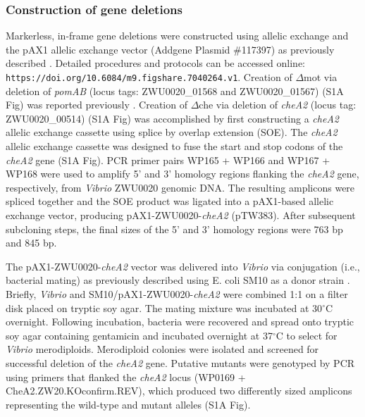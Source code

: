 {{{{{{{\subsubsection{Construction of gene deletions}
Markerless, in-frame gene deletions were constructed using allelic exchange and the pAX1 allelic exchange vector (Addgene Plasmid \#117397) as previously described \cite{wiles_modernized_2018}. Detailed procedures and protocols can be accessed online: \texttt{https://doi.org/10.6084/m9.figshare.7040264.v1}. Creation of $\Delta$mot via deletion of \textit{\textit{pomAB}} (locus tags: ZWU0020\_01568 and ZWU0020\_01567) (S1A Fig) was reported previously \cite{wiles_modernized_2018}. Creation of $\Delta$che via deletion of \textit{cheA2} (locus tag: ZWU0020\_00514) (S1A Fig) was accomplished by first constructing a \textit{cheA2} allelic exchange cassette using splice by overlap extension (SOE). The \textit{cheA2} allelic exchange cassette was designed to fuse the start and stop codons of the \textit{cheA2} gene (S1A Fig). PCR primer pairs WP165 + WP166 and WP167 + WP168 were used to amplify 5' and 3' homology regions flanking the \textit{cheA2} gene, respectively, from \textit{Vibrio} ZWU0020 genomic DNA. The resulting amplicons were spliced together and the SOE product was ligated into a pAX1-based allelic exchange vector, producing pAX1-ZWU0020-\textit{cheA2} (pTW383). After subsequent subcloning steps, the final sizes of the 5' and 3' homology regions were 763 bp and 845 bp.   

The pAX1-ZWU0020-\textit{cheA2} vector was delivered into \textit{Vibrio} via conjugation (i.e., bacterial mating) as previously described using E. coli SM10 as a donor strain \cite{wiles_modernized_2018}. Briefly, \textit{Vibrio} and SM10/pAX1-ZWU0020-\textit{cheA2} were combined 1:1 on a filter disk placed on tryptic soy agar. The mating mixture was incubated at 30$^\circ$C overnight. Following incubation, bacteria were recovered and spread onto tryptic soy agar containing gentamicin and incubated overnight at 37$^\circ$C to select for \textit{Vibrio} merodiploids. Merodiploid colonies were isolated and screened for successful deletion of the \textit{cheA2} gene. Putative mutants were genotyped by PCR using primers that flanked the \textit{cheA2} locus (WP0169 + CheA2.ZW20.KOconfirm.REV), which produced two differently sized amplicons representing the wild-type and mutant alleles (S1A Fig). 

}}}}}}}
